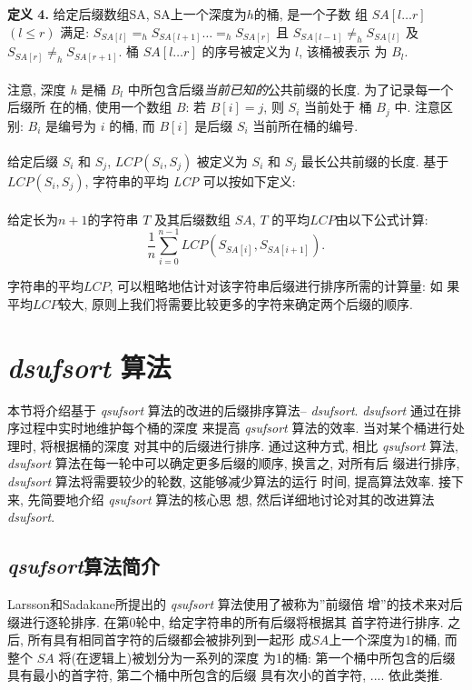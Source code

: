 \documentclass{ws-ijprai}
\begin{document}
\textbf{定义 4.} 给定后缀数组SA, SA上一个深度为$h$的桶, 是一个子数
组 $SA[l \dots r]$ $(l \leq r)$ 满足: $S_{SA[l]} =_h S_{SA[l+1]}\dots
=_h S_{SA[r]}$ 且 $S_{SA[l-1]} \neq_h S_{SA[l]}$ 及 $S_{SA[r]} \neq_h
S_{SA[r+1]}$. 桶 $SA[l \dots r]$ 的序号被定义为 $l$, 该桶被表示
为 $B_l$.\\
\\
注意, 深度 \emph{h} 是桶
$B_l$ 中所包含后缀\emph{当前已知的}公共前缀的长度. 为了记录每一个后缀所
在的桶, 使用一个数组 $B$: 若 $B[i] = j$, 则 $S_i$ 当前处于
桶 $B_j$ 中. 注意区别: $B_i$ 是编号为 $i$ 的桶, 而 $B[i]$ 是后缀
$S_i$ 当前所在桶的编号.\\
\\
给定后缀 $S_i$ 和 $S_j$, $LCP(S_i, S_j)$ 被定义为 $S_i$ 和
$S_j$ 最长公共前缀的长度. 基于 $LCP(S_i,
S_j)$, 字符串的平均 \emph{LCP} 可以按如下定义:\\
\\
给定长为$n+1$的字符串 $T$ 及其后缀数组 $SA$, $T$
的平均$LCP$由以下公式计算:\\

\begin{equation}
\frac{1}{n}\sum_{i=0}^{n-1}LCP(S_{SA[i]},S_{SA[i+1]}).
\end{equation}

字符串的平均$LCP$, 可以粗略地估计对该字符串后缀进行排序所需的计算量: 如
果平均$LCP$较大, 原则上我们将需要比较更多的字符来确定两个后缀的顺序.

\section{ \emph{dsufsort} 算法}

本节将介绍基于 \emph{qsufsort} 算法的改进的后缀排序算法--
\emph{dsufsort}. \emph{dsufsort} 通过在排序过程中实时地维护每个桶的深度
来提高 \emph{qsufsort} 算法的效率. 当对某个桶进行处理时, 将根据桶的深度
对其中的后缀进行排序. 通过这种方式, 相比 \emph{qsufsort} 算法,
\emph{dsufsort} 算法在每一轮中可以确定更多后缀的顺序, 换言之, 对所有后
缀进行排序, \emph{dsufsort} 算法将需要较少的轮数, 这能够减少算法的运行
时间, 提高算法效率. 接下来, 先简要地介绍 \emph{qsufsort} 算法的核心思
想, 然后详细地讨论对其的改进算法 \emph{dsufsort}.

\subsection{ \emph{qsufsort}算法简介}
\label{sec:qsufsort}

Larsson和Sadakane所提出的 \emph{qsufsort} 算法使用了被称为''前缀倍
增''的技术来对后缀进行逐轮排序. 在第0轮中, 给定字符串的所有后缀将根据其
首字符进行排序. 之后, 所有具有相同首字符的后缀都会被排列到一起形
成$SA$上一个深度为1的桶, 而整个 $SA$ 将(在逻辑上)被划分为一系列的深度
为1的桶: 第一个桶中所包含的后缀具有最小的首字符, 第二个桶中所包含的后缀
具有次小的首字符, .... 依此类推.
\end{document}
